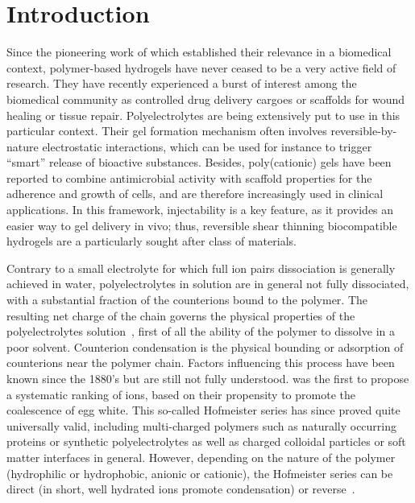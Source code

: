 \documentclass[twoside,twocolumn,9pt]{article}
\begin{document}
\section{Introduction}
Since the pioneering work of \citet{Wichterle1960} which established their relevance in a biomedical context, polymer-based hydrogels have never ceased to be a very active field of research\cite{Calo2015,Hoffman2001}. They have recently experienced a burst of interest among the biomedical community as controlled drug delivery cargoes or scaffolds for wound healing or tissue repair\cite{Vashist2014,Ratner2004}. Polyelectrolytes are being extensively put to use in this particular context\cite{Rosso2003,BinImran2014}. Their gel formation mechanism often involves reversible-by-nature electrostatic interactions, which can be used for instance to trigger ``smart'' release of bioactive substances\cite{Khare1993,Lockwood2007}. Besides, poly(cationic) gels have been reported to combine antimicrobial activity with scaffold properties for the adherence and growth of cells, and are therefore increasingly used in clinical applications\cite{Hoffman2001,Landers2002}. In this framework, injectability is a key feature, as it provides an easier way to gel delivery in vivo\cite{Tibbitt2016}; thus, reversible shear thinning biocompatible hydrogels are a particularly sought after class of materials\cite{Yu2008}.


Contrary to a small electrolyte for which full ion pairs dissociation is generally achieved in water, polyelectrolytes in solution are in general not fully dissociated, with a substantial fraction of the counterions bound to the polymer\cite{Manning1979}. The resulting net charge of the chain governs the physical properties of the polyelectrolytes solution~\cite{DeGennes1976,Khokhlov1980,Raphael1990,Dobrynin1995,Rubinstein1996}, first of all the ability of the polymer to dissolve in a poor solvent. Counterion condensation is the physical bounding or adsorption of counterions near the polymer chain. Factors influencing this process have been known since the 1880's but are still not fully understood. \citet{Hofmeister1888} was the first to propose a systematic ranking of ions, based on their propensity to promote the coalescence of egg white. This so-called Hofmeister series has since proved quite universally valid\cite{Zhang2010a}, including multi-charged polymers such as naturally occurring proteins or synthetic polyelectrolytes as well as charged colloidal particles\cite{Schwierz2010,Oncsik2015} or soft matter interfaces in general\cite{Leontidis2014}. However, depending on the nature of the polymer (hydrophilic or hydrophobic, anionic or cationic), the Hofmeister series can be direct (in short, well hydrated ions promote condensation) or reverse~\cite{Schwierz2010,Oncsik2015}.
\end{document}
